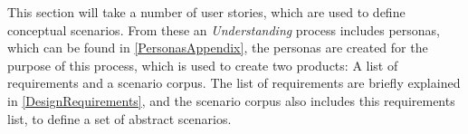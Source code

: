 This section will take a number of user stories, which are used to define conceptual scenarios. From these an \textit{Understanding} process includes personas, which can be found in \cref{PersonasAppendix}, the personas are created for the purpose of this process, which is used to create two products: A list of requirements and a scenario corpus. The list of requirements are briefly explained in \cref{DesignRequirements}, and the scenario corpus also includes this requirements list, to define a set of abstract scenarios.
